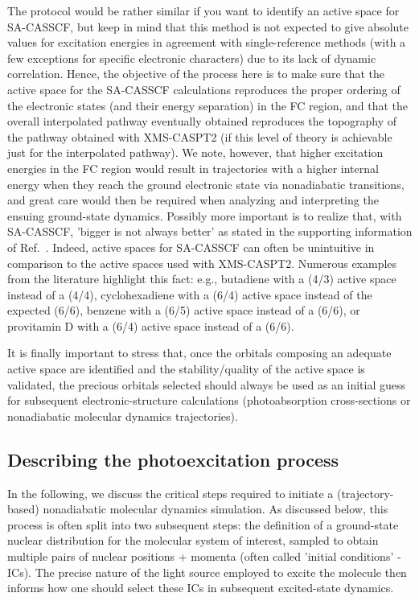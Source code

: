 \documentclass[9pt,bestpractices,pubversion]{livecoms}
\begin{document}
The protocol would be rather similar if you want to identify an active space for SA-CASSCF, but keep in mind that this method is not expected to give absolute values for excitation energies in agreement with single-reference methods (with a few exceptions for specific electronic characters) due to its lack of dynamic correlation. Hence, the objective of the process here is to make sure that the active space for the SA-CASSCF calculations reproduces the proper ordering of the electronic states (and their energy separation) in the FC region, and that the overall interpolated pathway eventually obtained reproduces the topography of the pathway obtained with XMS-CASPT2 (if this level of theory is achievable just for the interpolated pathway). We note, however, that higher excitation energies in the FC region would result in trajectories with a higher internal energy when they reach the ground electronic state via nonadiabatic transitions, and great care would then be required when analyzing and interpreting the ensuing ground-state dynamics. Possibly more important is to realize that, with SA-CASSCF, 'bigger is not always better' as stated in the supporting information of Ref.~. Indeed, active spaces for SA-CASSCF can often be unintuitive in comparison to the active spaces used with XMS-CASPT2. Numerous examples from the literature highlight this fact: e.g., butadiene\cite{levine2009} with a (4/3) active space instead of a (4/4), cyclohexadiene\cite{tao2011first} with a (6/4) active space instead of the expected (6/6), benzene\cite{thompson2011} with a (6/5) active space instead of a (6/6), or provitamin D\cite{snyder2016gpu} with a (6/4) active space instead of a (6/6).

It is finally important to stress that, once the orbitals composing an adequate active space are identified and the stability/quality of the active space is validated, the precious orbitals selected should always be used as an initial guess for subsequent electronic-structure calculations (photoabsorption cross-sections or nonadiabatic molecular dynamics trajectories).

\subsection{Describing the photoexcitation process}
\label{sec:initconds}

In the following, we discuss the critical steps required to initiate a (trajectory-based) nonadiabatic molecular dynamics simulation. As discussed below, this process is often split into two subsequent steps: the definition of a ground-state nuclear distribution for the molecular system of interest, sampled to obtain multiple pairs of nuclear positions + momenta (often called 'initial conditions' - ICs). The precise nature of the light source employed to excite the molecule then informs how one should select these ICs in subsequent excited-state dynamics.
\end{document}
